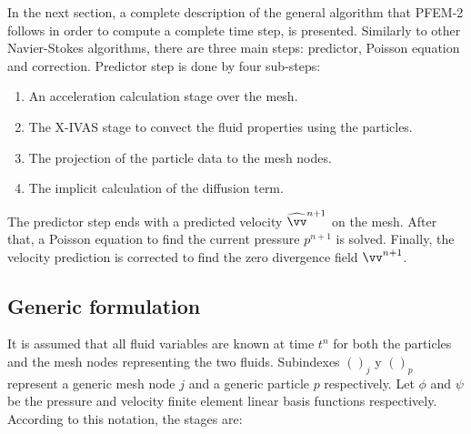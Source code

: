 In the next section, a complete description of the general algorithm that PFEM-2 follows in order to compute a complete time step, is presented. Similarly to other Navier-Stokes algorithms, there are three main steps: predictor, Poisson equation and correction. Predictor step is done by four sub-steps:

\begin{enumerate}
  \item An acceleration calculation stage over the mesh.
  \item The X-IVAS stage to convect the fluid properties using the particles.
  \item The projection of the particle data to the mesh nodes.
  \item The implicit calculation of the diffusion term.
\end{enumerate}

The predictor step ends with a predicted velocity $\widehat\vv^{n+1}$ on the mesh. After that, a Poisson equation to find the current pressure $p^{n+1}$ is solved. Finally, the velocity prediction is corrected to find the zero divergence field $\vv^{n+1}$.

\subsection{Generic formulation}\label{GeneralFor}

It is assumed that all fluid variables are known at time $t^n$ for both the particles and the mesh nodes representing the two fluids. Subindexes $()_j$ y $()_p$ represent a generic mesh node $j$ and a generic particle $p$ respectively. Let $\phi$ and $\psi$ be the pressure and velocity finite element linear basis functions respectively. According to this notation, the stages are:

